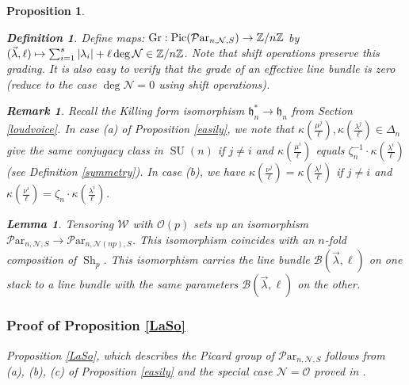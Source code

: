 \documentclass[11pt]{amsart}
\newcommand\op{\operatorname}
\newcommand\frh{\mathfrak{h}}
\newcommand\Pic{\operatorname{Pic}}
\newcommand\mw{\mathcal{W}}
\newcommand\mn{\mathcal{N}}
\newcommand\Par{\mathcal{P}\text{ar} }
\newtheorem{remark}[theorem]{ Remark}
\newtheorem{proposition}[theorem]{Proposition}
\newtheorem{lemma}[theorem]{Lemma}
\newtheorem{defi}[theorem]{Definition}
\numberwithin{theorem}{subsection}
\begin{document}
{\begin{proposition}
\begin{defi}\label{grade} Define maps: $\operatorname{Gr}:\Pic (\Par_{n,\mn,S})\to \Bbb{Z}/n\Bbb{Z}$ by
$(\vec{\lambda},\ell)\mapsto \sum_{i=1}^s|\lambda_i|+ \ell \deg\mn \in\Bbb{Z}/n\Bbb{Z}$. Note that shift operations preserve this grading.  It is also easy to verify that the grade of an effective line bundle is zero (reduce to the case $\deg\mn=0$ using shift operations).
\end{defi}

\begin{remark}\label{able}
Recall the Killing form isomorphism $\frh_n^*\to \frh_n$ from Section \ref{loudvoice}. In case (a) of Proposition \ref{easily}, we note that $\kappa(\frac{{\mu^j}}{\ell}),\kappa(\frac{\lambda^j}{\ell})\in \Delta_n$ give the same conjugacy class in $\op{SU}(n)$ if $j\neq i$ and $\kappa(\frac{{\mu^i}}{\ell})$ equals  $\zeta_n^{-1}\cdot \kappa(\frac{{\lambda^i}}{\ell})$ (see Definition  \ref{symmetry}). In case (b),
we have  $\kappa(\frac{{\nu^j}}{\ell})=\kappa(\frac{{\lambda^j}}{\ell})$ if $j\neq i$ and $\kappa(\frac{{\nu^i}}{\ell})=\zeta_n\cdot\kappa(\frac{{\lambda^i}}{\ell})$.
\end{remark}
\begin{lemma}\label{threepointone}
Tensoring $\mw$ with $\mathcal{O}(p)$ sets up an isomorphism $\Par_{n,\mn,S}\to \Par_{n,\mn(np),S}$. This isomorphism coincides with an $n$-fold composition of
$\operatorname{Sh}_p$. This isomorphism carries the line bundle $\mathcal{B}(\vec{\lambda},\ell)$ on one stack
to a line bundle with the same parameters $\mathcal{B}(\vec{\lambda},\ell)$ on the other.
\end{lemma}
\subsubsection{Proof of Proposition \ref{LaSo}}\label{shifty2}
Proposition \ref{LaSo}, which describes the Picard group of $\Par_{n,\mn,S}$ follows from (a), (b), (c) of Proposition \ref{easily} and the special case $\mn=\mathcal{O}$ proved in \cite{LS}.

\end{proposition}}
\end{document}
